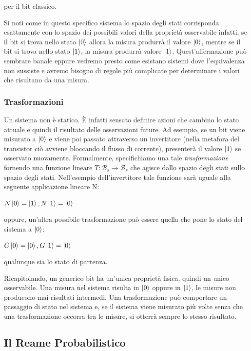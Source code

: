 \documentclass[12pt,a4paper,openright]{report}
\begin{document}
per il bit classico.\par
Si noti come in questo specifico sistema lo spazio degli stati corrisponda esattamente con lo spazio dei possibili valori della proprietà
osservabile infatti, se il bit si trova nello stato $\ket0$ allora la misura produrrà il valore $\ket0$, mentre se il bit si trova nello stato $\ket1$,
la misura produrrà valore $\ket1$. Quest'affermazione può sembrare banale eppure vedremo presto come esistano sistemi dove l'equivalenza 
non sussiste e avremo bisogno di regole più complicate per determinare i valori che risultano da una misura. 

\subsubsection{Trasformazioni}
Un sistema non è statico. È infatti sensato definire azioni che cambino lo stato attuale e quindi il risultato delle osservazioni future. Ad esempio,
se un bit viene misurato a $\ket0$ e viene poi passato attraverso un invertitore (nella metafora del transistor ciò avviene bloccando il flusso di corrente), presenterà il valore $\ket1$ se osservato nuovamente. 
Formalmente, specifichiamo una tale \emph{trasformazione} fornendo una funzione lineare $T:\mathcal{B}_s \rightarrow \mathcal{B}_s$ che agisce dallo spazio degli stati sullo spazio degli stati. 
Nell'esempio dell'invertitore tale funzione sarà uguale alla seguente applicazione lineare N:
\begin{center}
    $ N\ket0 = \ket1, N\ket1 = \ket0 $
\end{center}
oppure, un'altra possibile trasformazione può essere quella che pone lo stato del sistema a $\ket0$:
\begin{center}
    $G\ket0 = \ket0,  G\ket1 = \ket0$
\end{center}
qualunque sia lo stato di partenza.
\par
Ricapitolando, un generico bit ha un'unica proprietà fisica, quindi un unico osservabile. Una misura nel sistema risulta in $\ket0$ oppure in $\ket1$, le 
misure non producono mai risultati intermedi. Una trasformazione può comportare un passaggio di stato nel sistema e, se il sistema viene misurato più volte 
 senza che una trasformazione occorra tra le misure, si otterrà sempre lo stesso risultato.

\subsection{Il Reame Probabilistico}
\end{document}
